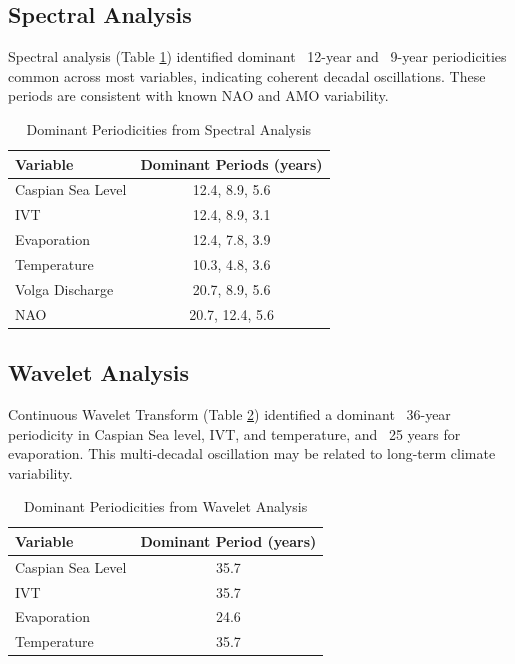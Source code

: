 \documentclass[12pt,letterpaper]{article}
\begin{document}
\subsection{Spectral Analysis}

Spectral analysis (Table \ref{tab:spectral_en}) identified dominant ~12-year and ~9-year periodicities common across most variables, indicating coherent decadal oscillations. These periods are consistent with known NAO and AMO variability.

\begin{table}[H]
\centering
\caption{Dominant Periodicities from Spectral Analysis}
\label{tab:spectral_en}
\begin{tabular}{lc}
\toprule
\textbf{Variable} & \textbf{Dominant Periods (years)} \\
\midrule
Caspian Sea Level & 12.4, 8.9, 5.6 \\
IVT & 12.4, 8.9, 3.1 \\
Evaporation & 12.4, 7.8, 3.9 \\
Temperature & 10.3, 4.8, 3.6 \\
Volga Discharge & 20.7, 8.9, 5.6 \\
NAO & 20.7, 12.4, 5.6 \\
\bottomrule
\end{tabular}
\end{table}

\subsection{Wavelet Analysis}

Continuous Wavelet Transform (Table \ref{tab:wavelet_en}) identified a dominant ~36-year periodicity in Caspian Sea level, IVT, and temperature, and ~25 years for evaporation. This multi-decadal oscillation may be related to long-term climate variability.

\begin{table}[H]
\centering
\caption{Dominant Periodicities from Wavelet Analysis}
\label{tab:wavelet_en}
\begin{tabular}{lc}
\toprule
\textbf{Variable} & \textbf{Dominant Period (years)} \\
\midrule
Caspian Sea Level & 35.7 \\
IVT & 35.7 \\
Evaporation & 24.6 \\
Temperature & 35.7 \\
\bottomrule
\end{tabular}
\end{table}
\end{document}
